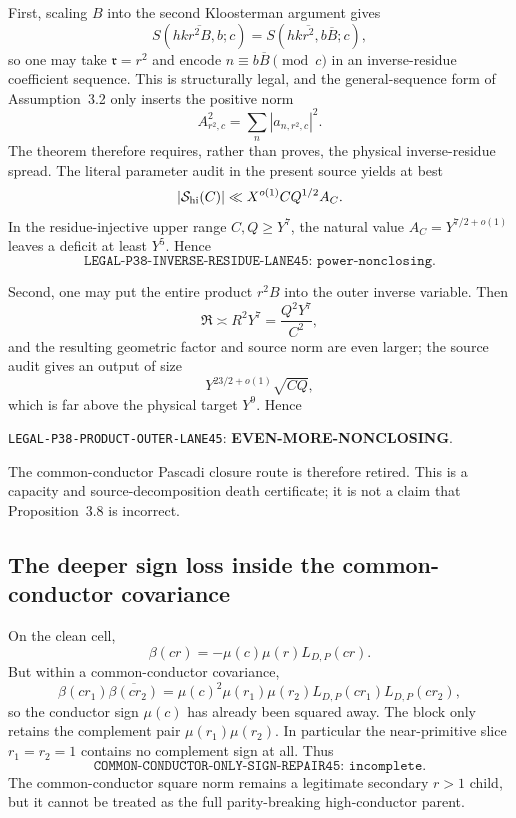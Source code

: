 \documentclass[11pt]{article}
\theoremstyle{definition}
\newcommand{\1}{\mathbf 1}
\begin{document}
First, scaling $B$ into the second Kloosterman argument gives
\[
 S(hk\overline{r^2B},b;c)
 =S(hk\overline{r^2},b\overline B;c),
\]
so one may take $\mathfrak r=r^2$ and encode
$n\equiv b\overline B\pmod c$ in an inverse-residue coefficient sequence.
This is structurally legal, and the general-sequence form of Assumption~3.2
only inserts the positive norm
\[
 A_{r^2,c}^2=\sum_n|a_{n,r^2,c}|^2.
\]
The theorem therefore requires, rather than proves, the physical inverse-residue
spread.  The literal parameter audit in the present source yields at best
\begin{equation}
 |\mathcal S_{\rm hi}(C)|
 \ll X^{o(1)} C Q^{1/2}A_C.
 \label{eq:p38-inverse-output}
\end{equation}
In the residue-injective upper range $C,Q\ge Y^7$, the natural value
$A_C=Y^{7/2+o(1)}$ leaves a deficit at least $Y^5$.  Hence
\[
 \boxed{\texttt{LEGAL-P38-INVERSE-RESIDUE-LANE45: power-nonclosing}.}
\]

Second, one may put the entire product $r^2B$ into the outer inverse variable.
Then
\[
 \mathfrak R\asymp R^2Y^7=\frac{Q^2Y^7}{C^2},
\]
and the resulting geometric factor and source norm are even larger; the
source audit gives an output of size
\[
 Y^{23/2+o(1)}\sqrt{CQ},
\]
which is far above the physical target $Y^9$.  Hence
\begin{center}
\small\texttt{LEGAL-P38-PRODUCT-OUTER-LANE45}: 
\textbf{EVEN-MORE-NONCLOSING}.
\end{center}
The common-conductor Pascadi closure route is therefore retired.  This is a
capacity and source-decomposition death certificate; it is not a claim that
Proposition~3.8 is incorrect.

\subsection{The deeper sign loss inside the common-conductor covariance}

On the clean cell,
\[
 \beta(cr)=-\mu(c)\mu(r)L_{D,P}(cr).
\]
But within a common-conductor covariance,
\[
 \beta(cr_1)\overline{\beta(cr_2)}
 =\mu(c)^2\mu(r_1)\mu(r_2)L_{D,P}(cr_1)L_{D,P}(cr_2),
\]
so the conductor sign $\mu(c)$ has already been squared away.  The block only
retains the complement pair $\mu(r_1)\mu(r_2)$.  In particular the
near-primitive slice $r_1=r_2=1$ contains no complement sign at all.  Thus
\[
 \boxed{\texttt{COMMON-CONDUCTOR-ONLY-SIGN-REPAIR45: incomplete}.}
\]
The common-conductor square norm remains a legitimate secondary $r>1$ child,
but it cannot be treated as the full parity-breaking high-conductor parent.
\end{document}
